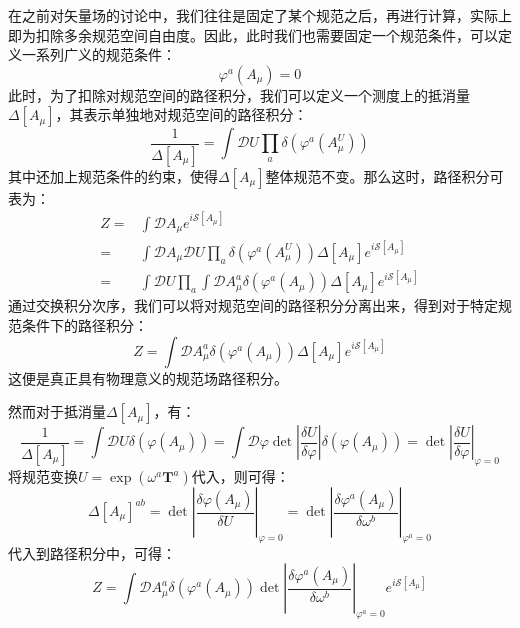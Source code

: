 在之前对矢量场的讨论中，我们往往是固定了某个规范之后，再进行计算，实际上即为扣除多余规范空间自由度。因此，此时我们也需要固定一个规范条件，可以定义一系列广义的规范条件：
\begin{equation}
	\varphi^a(A_\mu)=0
\end{equation}
此时，为了扣除对规范空间的路径积分，我们可以定义一个测度上的抵消量$\Delta[A_\mu]$，其表示单独地对规范空间的路径积分：
\begin{equation}
	\frac{1}{\Delta[A_\mu]}=\int\mathcal{D}U\prod_a\delta(\varphi^a(A_\mu^U))
\end{equation}
其中还加上规范条件的约束，使得$\Delta[A_\mu]$整体规范不变。那么这时，路径积分可表为：
\begin{equation}
	\begin{split}
		Z=&\int\mathcal{D}A_\mu e^{i\mathcal{S}[A_\mu]}\\
		=&\int\mathcal{D}A_\mu\mathcal{D}U\prod_a\delta(\varphi^a(A_\mu^U))\Delta[A_\mu] e^{i\mathcal{S}[A_\mu]}\\
		=&\int\mathcal{D}U\prod_a\int\mathcal{D}A_\mu^a\delta(\varphi^a(A_\mu))\Delta[A_\mu] e^{i\mathcal{S}[A_\mu]}
	\end{split}
\end{equation}
通过交换积分次序，我们可以将对规范空间的路径积分分离出来，得到对于特定规范条件下的路径积分：
\begin{equation}
	Z=\int\mathcal{D}A_\mu^a\delta(\varphi^a(A_\mu))\Delta[A_\mu] e^{i\mathcal{S}[A_\mu]}
\end{equation}
这便是真正具有物理意义的规范场路径积分。

然而对于抵消量$\Delta[A_\mu]$，有：
\begin{equation}
	\frac{1}{\Delta[A_\mu]}=\int\mathcal{D}U\delta(\varphi(A_\mu))=\int\mathcal{D}\varphi\det\left|\frac{\delta U}{\delta \varphi}\right|\delta(\varphi(A_\mu))=\det\left|\frac{\delta U}{\delta\varphi}\right|_{\varphi=0}
\end{equation}
将规范变换$U=\exp(\omega^a\boldsymbol{T}^a)$代入，则可得：
\begin{equation}
	\Delta[A_\mu]^{ab}=\det\left|\frac{\delta\varphi(A_\mu)}{\delta U}\right|_{\varphi=0}=\det\left|\frac{\delta\varphi^a(A_\mu)}{\delta \omega^b}\right|_{\varphi^a=0}
\end{equation}
代入到路径积分中，可得：
\begin{equation}
	Z=\int\mathcal{D}A^a_\mu\delta(\varphi^a(A_\mu))\det\left|\frac{\delta\varphi^a(A_\mu)}{\delta \omega^b}\right|_{\varphi^a=0}e^{i\mathcal{S}[A_\mu]}
\end{equation}

